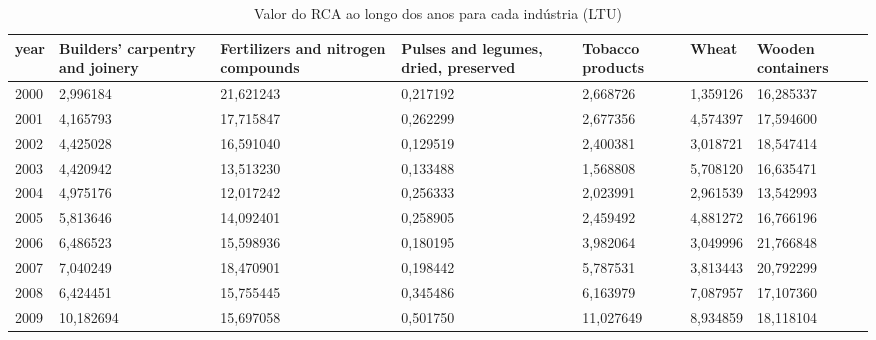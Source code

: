 \begin{table}
\centering
\caption{Valor do RCA ao longo dos anos para cada indústria (LTU)}
\begin{tabular}{p{1cm}p{2cm}p{2cm}p{2cm}p{2cm}p{2cm}p{2cm}}
\toprule
 year &  Builders' carpentry and joinery &  Fertilizers and nitrogen compounds &  Pulses and legumes, dried, preserved &  Tobacco products &     Wheat &  Wooden containers \\
\midrule
 2000 &                         2,996184 &                           21,621243 &                              0,217192 &          2,668726 &  1,359126 &          16,285337 \\
 2001 &                         4,165793 &                           17,715847 &                              0,262299 &          2,677356 &  4,574397 &          17,594600 \\
 2002 &                         4,425028 &                           16,591040 &                              0,129519 &          2,400381 &  3,018721 &          18,547414 \\
 2003 &                         4,420942 &                           13,513230 &                              0,133488 &          1,568808 &  5,708120 &          16,635471 \\
 2004 &                         4,975176 &                           12,017242 &                              0,256333 &          2,023991 &  2,961539 &          13,542993 \\
 2005 &                         5,813646 &                           14,092401 &                              0,258905 &          2,459492 &  4,881272 &          16,766196 \\
 2006 &                         6,486523 &                           15,598936 &                              0,180195 &          3,982064 &  3,049996 &          21,766848 \\
 2007 &                         7,040249 &                           18,470901 &                              0,198442 &          5,787531 &  3,813443 &          20,792299 \\
 2008 &                         6,424451 &                           15,755445 &                              0,345486 &          6,163979 &  7,087957 &          17,107360 \\
 2009 &                        10,182694 &                           15,697058 &                              0,501750 &         11,027649 &  8,934859 &          18,118104 \\

\end{tabular}
\end{table}

